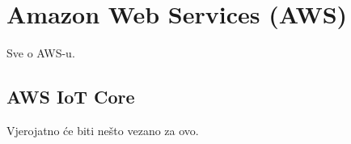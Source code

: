 \chapter{Amazon Web Services (AWS)}

Sve o AWS-u.

\section{AWS IoT Core}

Vjerojatno će biti nešto vezano za ovo.

\eject